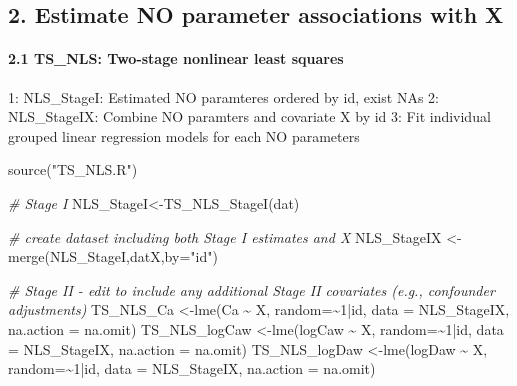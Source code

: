 \documentclass[
]{article}
\newenvironment{Shaded}{\begin{snugshade}}{\end{snugshade}}
\newcommand{\AttributeTok}[1]{\textcolor[rgb]{0.77,0.63,0.00}{#1}}
\newcommand{\CommentTok}[1]{\textcolor[rgb]{0.56,0.35,0.01}{\textit{#1}}}
\newcommand{\DecValTok}[1]{\textcolor[rgb]{0.00,0.00,0.81}{#1}}
\newcommand{\FunctionTok}[1]{\textcolor[rgb]{0.00,0.00,0.00}{#1}}
\newcommand{\NormalTok}[1]{#1}
\newcommand{\OtherTok}[1]{\textcolor[rgb]{0.56,0.35,0.01}{#1}}
\newcommand{\SpecialCharTok}[1]{\textcolor[rgb]{0.00,0.00,0.00}{#1}}
\newcommand{\StringTok}[1]{\textcolor[rgb]{0.31,0.60,0.02}{#1}}
\begin{document}
\hypertarget{estimate-no-parameter-associations-with-x}{%
\subsection{2. Estimate NO parameter associations with
X}\label{estimate-no-parameter-associations-with-x}}

\hypertarget{ts_nls-two-stage-nonlinear-least-squares}{%
\paragraph{2.1 TS\_NLS: Two-stage nonlinear least
squares}\label{ts_nls-two-stage-nonlinear-least-squares}}

1: NLS\_StageI: Estimated NO paramteres ordered by id, exist NAs 2:
NLS\_StageIX: Combine NO paramters and covariate X by id 3: Fit
individual grouped linear regression models for each NO parameters

\begin{Shaded}
\begin{Highlighting}[]
\FunctionTok{source}\NormalTok{(}\StringTok{"TS\_NLS.R"}\NormalTok{)}

\CommentTok{\# Stage I }
\NormalTok{NLS\_StageI}\OtherTok{\textless{}{-}}\FunctionTok{TS\_NLS\_StageI}\NormalTok{(dat)}

\CommentTok{\# create dataset including both Stage I estimates and X}
\NormalTok{NLS\_StageIX }\OtherTok{\textless{}{-}} \FunctionTok{merge}\NormalTok{(NLS\_StageI,datX,}\AttributeTok{by=}\StringTok{"id"}\NormalTok{)}

\CommentTok{\# Stage II {-}  edit to include any additional Stage II covariates (e.g., confounder adjustments)}
\NormalTok{TS\_NLS\_Ca     }\OtherTok{\textless{}{-}}\FunctionTok{lme}\NormalTok{(Ca }\SpecialCharTok{\textasciitilde{}}\NormalTok{ X,     }\AttributeTok{random=}\SpecialCharTok{\textasciitilde{}}\DecValTok{1}\SpecialCharTok{|}\NormalTok{id, }\AttributeTok{data =}\NormalTok{ NLS\_StageIX, }\AttributeTok{na.action =}\NormalTok{ na.omit)}
\NormalTok{TS\_NLS\_logCaw }\OtherTok{\textless{}{-}}\FunctionTok{lme}\NormalTok{(logCaw }\SpecialCharTok{\textasciitilde{}}\NormalTok{ X, }\AttributeTok{random=}\SpecialCharTok{\textasciitilde{}}\DecValTok{1}\SpecialCharTok{|}\NormalTok{id, }\AttributeTok{data =}\NormalTok{ NLS\_StageIX, }\AttributeTok{na.action =}\NormalTok{ na.omit)}
\NormalTok{TS\_NLS\_logDaw }\OtherTok{\textless{}{-}}\FunctionTok{lme}\NormalTok{(logDaw }\SpecialCharTok{\textasciitilde{}}\NormalTok{ X, }\AttributeTok{random=}\SpecialCharTok{\textasciitilde{}}\DecValTok{1}\SpecialCharTok{|}\NormalTok{id, }\AttributeTok{data =}\NormalTok{ NLS\_StageIX, }\AttributeTok{na.action =}\NormalTok{ na.omit)}
\end{Highlighting}
\end{Shaded}
\end{document}
